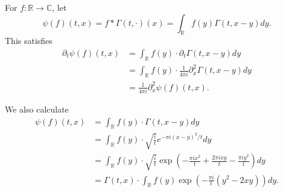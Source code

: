 \documentclass{article}
\theoremstyle{definition}
\begin{document}
For $f:\mathbb{R} \to \mathbb{C}$, let
\[
\psi(f)(t,x) = f*\Gamma(t,\cdot)(x) = \int_{\mathbb{R}} f(y) \Gamma(t,x-y) dy.
\]
This satisfies
\begin{align*}
\partial_t \psi(f)(t,x)& = \int_{\mathbb{R}} f(y) \cdot \partial_t \Gamma(t,x-y) dy\\
&=\int_{\mathbb{R}} f(y) \cdot \frac{1}{4\pi i} \partial_x^2 \Gamma(t,x-y) dy\\
&=\frac{1}{4\pi i} \partial_x^2 \psi(f)(t,x).
\end{align*}

We also calculate
\begin{align*}
\psi(f)(t,x)&= \int_{\mathbb{R}} f(y) \cdot \Gamma(t,x-y) dy\\
&=\int_{\mathbb{R}} f(y) \cdot \sqrt{\frac{i}{t}} e^{-\pi i(x-y)^2/t} dy\\
&=\int_{\mathbb{R}} f(y) \cdot \sqrt{\frac{i}{t}} \exp\left(-\frac{\pi ix^2}{t} + \frac{2\pi ixy}{t} - \frac{\pi i y^2}{t}\right) dy\\
&=\Gamma(t,x) \cdot \int_{\mathbb{R}} f(y) \exp\left( - \frac{\pi i}{t} (y^2-2xy) \right) dy.
\end{align*}
\end{document}
